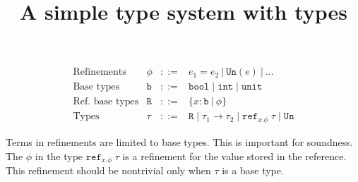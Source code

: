 \documentclass[a4paper,11pt]{article}
\title{A simple type system with {\tun} types}
\date{}
\newcommand{\type}[1]{\ensuremath{\mathtt{#1}}}
\newcommand{\tun}{\type{Un}}
\newcommand{\tbase}{\type{b}}
\newcommand{\tbref}{\type{R}}
\newcommand{\tbool}{\type{bool}}
\newcommand{\tint}{\type{int}}
\newcommand{\tunit}{\type{unit}}
\newcommand{\tref}[2]{\type{ref}_{#2}\;#1}
\newcommand{\peq}[2]{#1 = #2}
\newcommand{\pun}[1]{\type{Un}(#1)}
\newcommand{\sep}{\;|\;}
\begin{document}
\maketitle

\[
\begin{array}{llll}
\mbox{Refinements} & \phi & ::= & \peq{e_1}{e_2} ~|~ \pun{e} ~|~ \ldots  \\
  \mbox{Base types} & \tbase & ::= & \tbool \sep \tint \sep \tunit \\
\mbox{Ref.\ base types} & \tbref & ::= & \{x : \tbase ~|~ \phi\}\\
  
  \mbox{Types} & \tau & ::= & \tbref \sep \tau_1 \to \tau_2 \sep \tref{\tau}{x.\phi} \sep \tun  
\end{array}
\]

Terms in refinements are limited to base types. This is important for
soundness. The $\phi$ in the type $\tref{\tau}{x.\phi}$ is a
refinement for the value stored in the reference. This refinement
should be nontrivial only when $\tau$ is a base type.
\end{document}
